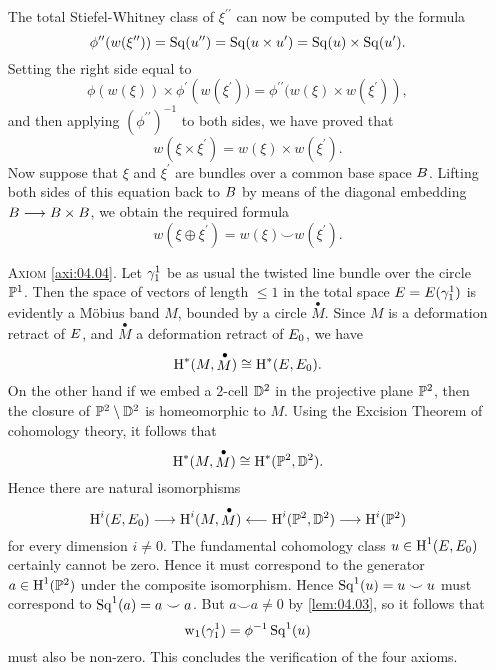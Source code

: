 \documentclass[../main]{subfiles}
\begin{document}
\begin{enumerate}
The total Stiefel-Whitney class of $\xi^{\prime \prime}$ can now be computed by the formula
\[
\phi^{\prime \prime}(w(\xi^{\prime \prime}))=\operatorname{Sq}(u^{\prime \prime})=\operatorname{Sq}(u \times u^{\prime})=\operatorname{Sq}(u) \times \operatorname{Sq}(u^{\prime}).
\]
Setting the right side equal to
\[
\phi\left(w(\xi)\right) \times \phi^{\prime}\left(w(\xi^{\prime}))=\phi^{\prime \prime}(w(\xi) \times w(\xi^{\prime})\right),
\]
and then applying $(\phi^{\prime \prime})^{-1}$ to both sides, we have proved that
\[
w(\xi \times \xi^{\prime})=w(\xi) \times w(\xi^{\prime}).
\]
Now suppose that $\xi$ and $\xi^{\prime}$ are bundles over a common base space $B$. Lifting both sides of this equation back to $B$ by means of the diagonal embedding $B  \longrightarrow B \times B $, we obtain the required formula
\[
w(\xi \oplus \xi^{\prime})=w(\xi) \smile w(\xi^{\prime}).
\]
\item[\textsc{Axiom} \ref{axi:04.04}.]  Let $\gamma_{1}^{1}$ be as usual the twisted line bundle over the circle $\mathbb{P}^{1}$. Then the space of vectors of length $\leq 1$ in the total space $E=E(\gamma_{1}^{1})$ is evidently a M\"obius band $M$, bounded by a circle $\stackrel{\bullet}{M}$. Since $M$ is a deformation retract of $E$, and $\stackrel{\bullet}{M}$ a deformation retract of $E_{0}$, we have
\[
\operatorname{H}^{*}(M, \stackrel{\bullet}{M}) \cong \operatorname{H}^{*}(E, E_{0}).
\]
On the other hand if we embed a $2$-cell $\mathbb{D}^{2}$ in the projective plane $\mathbb{P}^{2}$, then the closure of $\mathbb{P}^{2}\setminus\mathbb{D}^{2}$ is homeomorphic to $M$. Using the Excision Theorem of cohomology theory, it follows that
\[
\operatorname{H}^{*}(M, \stackrel{\bullet}{M}) \cong \operatorname{H}^{*}(\mathbb{P}^{2}, \mathbb{D}^{2}).
\]
Hence there are natural isomorphisms
\[
\operatorname{H}^{i}(E, E_{0}) \longrightarrow \operatorname{H}^{i}(M, \stackrel{\bullet}{M}) \longleftarrow \operatorname{H}^{i}(\mathbb{P}^{2}, \mathbb{D}^{2}) \longrightarrow \operatorname{H}^{i}(\mathbb{P}^{2})
\]
for every dimension $i \neq 0$. The fundamental cohomology class $u \in \operatorname{H}^{1}(E, E_{0})$ certainly cannot be zero. Hence it must correspond to the generator \newline$a \in \operatorname{H}^{1}(\mathbb{P}^{2})$ under the composite isomorphism. Hence $\operatorname{Sq}^{1}(u)=u \smile u$ must correspond to $\operatorname{Sq}^{1}(a)=a \smile a$. But $a \smile a \neq 0$ by \ref{lem:04.03}, so it follows that
\[
\operatorname{w}_{1}(\gamma_{1}^{1})=\phi^{-1} \operatorname{Sq}^{1}(u)
\]
must also be non-zero. This concludes the verification of the four axioms.
\end{enumerate}
\end{document}
